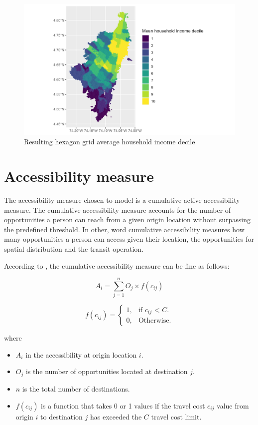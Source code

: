 \documentclass[12pt, a4paper]{report}
\begin{document}
\begin{figure}[H]
    \centering
    \includegraphics[width=13cm]{Data/Results/Images/Demo_income_decile_discrete.png}
    \caption{Resulting hexagon grid average household income decile}
    \label{fig:Income_Decile_Hex}
\end{figure}


\section{Accessibility measure}

The accessibility measure chosen to model is a cumulative active accessibility measure. The cumulative accessibility measure accounts for the number of opportunities a person can reach from a given origin location without surpassing the predefined threshold. In other, word cumulative accessibility measures how many opportunities a person can access given their location, the opportunities for spatial distribution and the transit operation.

According to \cite{pereiraIntroductionUrbanAccessibility2023a}, the cumulative accessibility measure can be fine as follows:

\[A_{i}=\sum_{j=1}^{n} O_{j} \times f(c_{ij})\]

\[f(c_{ij})=\begin{cases}
1, & \text{if $c_{ij}$ < $C$}.\\
0, & \text{Otherwise}.
  \end{cases}
\]

where

\begin{itemize}
    \item $A_{i}$ in the accessibility at origin location $i$.
    \item $O_{j}$ is the number of opportunities located at destination $j$.
    \item $n$ is the total number of destinations.
    \item $f(c_{ij})$ is a function that takes 0 or 1 values if the travel cost $c_{ij}$ value from origin $i$ to destination $j$ has exceeded the $C$ travel cost limit. 
\end{itemize}
\end{document}
